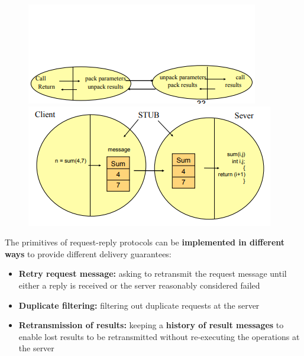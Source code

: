 \begin{figure}[!htb]
    \begin{minipage}{0.48\textwidth}
        \centering
        \includegraphics[width=.9\linewidth]{images/requestReplayCommunication/rpc1.png}
    \end{minipage}\hfill
    \begin{minipage}{0.48\textwidth} 
        \centering
        \includegraphics[width=.9\linewidth]{images/requestReplayCommunication/rpc2.png}
    \end{minipage}
\end{figure}
The primitives of request-reply protocols can be \textbf{implemented in different ways} to provide different delivery guarantees:
\begin{itemize}
    \item \textbf{Retry request message:} asking to retransmit the request message until either a reply is received or the server reasonably considered failed
    \item \textbf{Duplicate filtering:} filtering out duplicate requests at the server
    \item \textbf{Retransmission of results:} keeping a \textbf{history of result messages} to enable lost results to be retransmitted without re-executing the operations at the server
\end{itemize}

